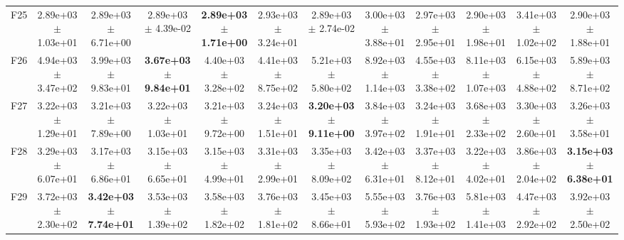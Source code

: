 \begin{table}
{\begin{tabular}{lccccccccccc}
F25 & 2.89e+03 $\pm$ 1.03e+01 & 2.89e+03 $\pm$ 6.71e+00 & 2.89e+03 $\pm$ 4.39e-02 & \textbf{2.89e+03 $\pm$ 1.71e+00} & 2.93e+03 $\pm$ 3.24e+01 & 2.89e+03 $\pm$ 2.74e-02 & 3.00e+03 $\pm$ 3.88e+01 & 2.97e+03 $\pm$ 2.95e+01 & 2.90e+03 $\pm$ 1.98e+01 & 3.41e+03 $\pm$ 1.02e+02 & 2.90e+03 $\pm$ 1.88e+01 \\
F26 & 4.94e+03 $\pm$ 3.47e+02 & 3.99e+03 $\pm$ 9.83e+01 & \textbf{3.67e+03 $\pm$ 9.84e+01} & 4.40e+03 $\pm$ 3.28e+02 & 4.41e+03 $\pm$ 8.75e+02 & 5.21e+03 $\pm$ 5.80e+02 & 8.92e+03 $\pm$ 1.14e+03 & 4.55e+03 $\pm$ 3.38e+02 & 8.11e+03 $\pm$ 1.07e+03 & 6.15e+03 $\pm$ 4.88e+02 & 5.89e+03 $\pm$ 8.71e+02 \\
F27 & 3.22e+03 $\pm$ 1.29e+01 & 3.21e+03 $\pm$ 7.89e+00 & 3.22e+03 $\pm$ 1.03e+01 & 3.21e+03 $\pm$ 9.72e+00 & 3.24e+03 $\pm$ 1.51e+01 & \textbf{3.20e+03 $\pm$ 9.11e+00} & 3.84e+03 $\pm$ 3.97e+02 & 3.24e+03 $\pm$ 1.91e+01 & 3.68e+03 $\pm$ 2.33e+02 & 3.30e+03 $\pm$ 2.60e+01 & 3.26e+03 $\pm$ 3.58e+01 \\
F28 & 3.29e+03 $\pm$ 6.07e+01 & 3.17e+03 $\pm$ 6.86e+01 & 3.15e+03 $\pm$ 6.65e+01 & 3.15e+03 $\pm$ 4.99e+01 & 3.31e+03 $\pm$ 2.99e+01 & 3.35e+03 $\pm$ 8.09e+02 & 3.42e+03 $\pm$ 6.31e+01 & 3.37e+03 $\pm$ 8.12e+01 & 3.22e+03 $\pm$ 4.02e+01 & 3.86e+03 $\pm$ 2.04e+02 & \textbf{3.15e+03 $\pm$ 6.38e+01} \\
F29 & 3.72e+03 $\pm$ 2.30e+02 & \textbf{3.42e+03 $\pm$ 7.74e+01} & 3.53e+03 $\pm$ 1.39e+02 & 3.58e+03 $\pm$ 1.82e+02 & 3.76e+03 $\pm$ 1.81e+02 & 3.45e+03 $\pm$ 8.66e+01 & 5.55e+03 $\pm$ 5.93e+02 & 3.76e+03 $\pm$ 1.93e+02 & 5.81e+03 $\pm$ 1.41e+03 & 4.47e+03 $\pm$ 2.92e+02 & 3.92e+03 $\pm$ 2.50e+02 \\
\bottomrule
\end{tabular}%
}
\end{table}
